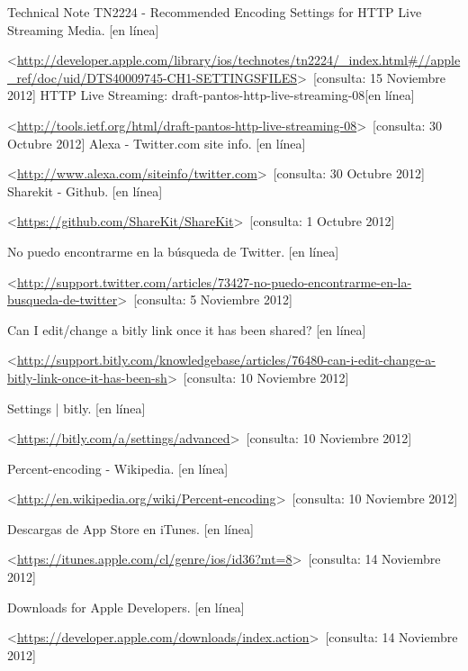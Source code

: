 \begin{thebibliography}{99}
\begin{sloppypar}
Technical Note TN2224 - Recommended Encoding Settings for HTTP Live Streaming Media. [en línea]\

\textless \url{http://developer.apple.com/library/ios/technotes/tn2224/_index.html\#//apple_ref/doc/uid/DTS40009745-CH1-SETTINGSFILES}\textgreater \ [consulta: 15 Noviembre 2012]
HTTP Live Streaming: draft-pantos-http-live-streaming-08[en línea]\

\textless \url{http://tools.ietf.org/html/draft-pantos-http-live-streaming-08}\textgreater \ [consulta: 30 Octubre 2012]
%
Alexa - Twitter.com site info. [en línea]\

\textless \url{http://www.alexa.com/siteinfo/twitter.com}\textgreater \ [consulta: 30 Octubre 2012] 
%
Sharekit - Github. [en línea]\

\textless \url{https://github.com/ShareKit/ShareKit}\textgreater \ [consulta: 1 Octubre 2012] 

%
No puedo encontrarme en la búsqueda de Twitter. [en línea]

\textless \url{http://support.twitter.com/articles/73427-no-puedo-encontrarme-en-la-busqueda-de-twitter}\textgreater \ [consulta: 5 Noviembre 2012] 

%
Can I edit/change a bitly link once it has been shared? [en línea]\

\textless \url{http://support.bitly.com/knowledgebase/articles/76480-can-i-edit-change-a-bitly-link-once-it-has-been-sh}\textgreater \ [consulta: 10 Noviembre 2012] 

%
Settings | bitly. [en línea]\

\textless \url{https://bitly.com/a/settings/advanced}\textgreater \ [consulta: 10 Noviembre 2012] 

%
Percent-encoding - Wikipedia. [en línea]\

\textless \url{http://en.wikipedia.org/wiki/Percent-encoding}\textgreater \ [consulta: 10 Noviembre 2012] 

%
Descargas de App Store en iTunes. [en línea]\

\textless \url{https://itunes.apple.com/cl/genre/ios/id36?mt=8}\textgreater \ [consulta: 14 Noviembre 2012] 

%
Downloads for Apple Developers. [en línea]\

\textless \url{https://developer.apple.com/downloads/index.action}\textgreater \ [consulta: 14 Noviembre 2012]


\end{sloppypar}
\end{thebibliography}
